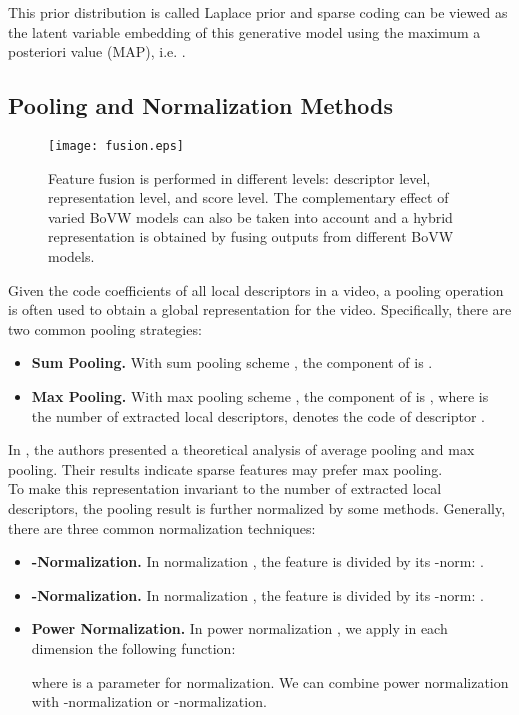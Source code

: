 \documentclass[twocolumn]{svjour3}          \smartqed  \usepackage{slashbox}
\begin{document}
This prior distribution is called Laplace prior and sparse coding can be viewed as the latent variable embedding of this generative model using the maximum a posteriori value (MAP), i.e. .

\subsection{Pooling and Normalization Methods}
\begin{figure*}[!htb]
  \centering
  \texttt{[image: fusion.eps]}
  \caption{Feature fusion is performed in different levels: descriptor level, representation level, and score level. The complementary effect of varied BoVW models can also be taken into account and a hybrid representation is obtained by fusing outputs from different BoVW models.}
  \label{fig:fusion}
\end{figure*}

Given the code coefficients of all local descriptors in a video, a pooling operation is often used to obtain a global representation  for the video. Specifically, there are two common pooling strategies:
\begin{itemize}
\item \textbf{Sum Pooling.} With sum pooling scheme \cite{LazebnikSP06}, the  component of  is .
\item \textbf{Max Pooling.} With max pooling scheme \cite{YangYGH09}, the  component of  is , where  is the number of extracted local descriptors,  denotes the code of descriptor .
\end{itemize}
In \cite{BoureauPL10}, the authors presented a theoretical analysis of average pooling and max pooling. Their results indicate sparse features may prefer max pooling.\\

To make this representation invariant to the number of extracted local descriptors, the pooling result   is further normalized by some methods. Generally, there are three common normalization techniques:
\begin{itemize}
\item \textbf{-Normalization.} In  normalization \cite{YangYGH09}, the feature  is divided by its -norm: .
\item \textbf{-Normalization.} In  normalization \cite{PerronninSM10}, the feature  is divided by its -norm: .
\item \textbf{Power Normalization.} In power normalization \cite{PerronninSM10}, we apply in each dimension the following function:

where  is a parameter for normalization. We can combine power normalization with -normalization or  -normalization.
\end{itemize}
\end{document}
